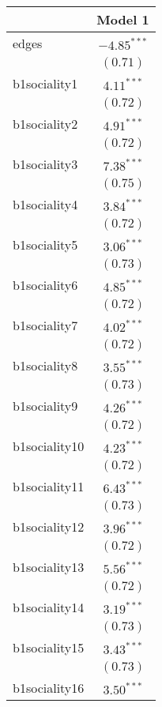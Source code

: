 
\begin{table}
\begin{center}
\begin{tabular}{l c}
\hline
 & Model 1 \\
\hline
edges         & $-4.85^{***}$ \\
              & $(0.71)$      \\
b1sociality1  & $4.11^{***}$  \\
              & $(0.72)$      \\
b1sociality2  & $4.91^{***}$  \\
              & $(0.72)$      \\
b1sociality3  & $7.38^{***}$  \\
              & $(0.75)$      \\
b1sociality4  & $3.84^{***}$  \\
              & $(0.72)$      \\
b1sociality5  & $3.06^{***}$  \\
              & $(0.73)$      \\
b1sociality6  & $4.85^{***}$  \\
              & $(0.72)$      \\
b1sociality7  & $4.02^{***}$  \\
              & $(0.72)$      \\
b1sociality8  & $3.55^{***}$  \\
              & $(0.73)$      \\
b1sociality9  & $4.26^{***}$  \\
              & $(0.72)$      \\
b1sociality10 & $4.23^{***}$  \\
              & $(0.72)$      \\
b1sociality11 & $6.43^{***}$  \\
              & $(0.73)$      \\
b1sociality12 & $3.96^{***}$  \\
              & $(0.72)$      \\
b1sociality13 & $5.56^{***}$  \\
              & $(0.72)$      \\
b1sociality14 & $3.19^{***}$  \\
              & $(0.73)$      \\
b1sociality15 & $3.43^{***}$  \\
              & $(0.73)$      \\
b1sociality16 & $3.50^{***}$  \\

\end{tabular}
\end{center}
\end{table}
